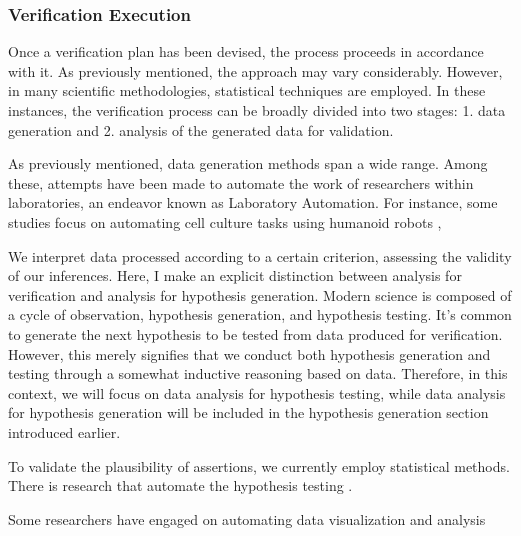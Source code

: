 \documentclass{book}
\begin{document}
\subsubsection{Verification Execution}

Once a verification plan has been devised, the process proceeds in accordance with it. As previously mentioned, the approach may vary considerably. However, in many scientific methodologies, statistical techniques are employed. In these instances, the verification process can be broadly divided into two stages: 1. data generation and 2. analysis of the generated data for validation.

As previously mentioned, data generation methods span a wide range. Among these, attempts have been made to automate the work of researchers within laboratories, an endeavor known as Laboratory Automation. For instance, 
some studies focus on automating cell culture tasks using humanoid robots \cite{ochiai2021variable},

We interpret data processed according to a certain criterion, assessing the validity of our inferences. Here, I make an explicit distinction between analysis for verification and analysis for hypothesis generation. Modern science is composed of a cycle of observation, hypothesis generation, and hypothesis testing. It's common to generate the next hypothesis to be tested from data produced for verification. However, this merely signifies that we conduct both hypothesis generation and testing through a somewhat inductive reasoning based on data. Therefore, in this context, we will focus on data analysis for hypothesis testing, while data analysis for hypothesis generation will be included in the hypothesis generation section introduced earlier.

To validate the plausibility of assertions, we currently employ statistical methods. There is research that automate the hypothesis testing \cite{gil2016automated}. 

Some researchers have engaged on automating data visualization and analysis \cite{bavishi2021vizsmith,bavishi2022tools}
\end{document}
